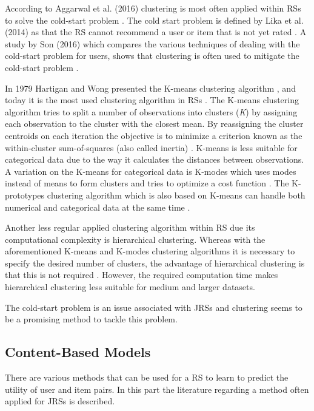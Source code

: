 According to Aggarwal et al. (2016) clustering is most often applied within RSs to solve the cold-start problem \cite{aggarwal2016recommender}.
The cold start problem is defined by Lika et al. (2014) as that the RS cannot recommend a user or item that is not yet rated \cite{lika2014facing}.
A study by Son (2016) which compares the various techniques of dealing with the cold-start problem for users, shows that clustering is often used to mitigate the cold-start problem \cite{son2016dealing}.

In 1979 Hartigan and Wong presented the K-means clustering algorithm \cite{hartigan1979algorithm}, and today it is the most used clustering algorithm in RSs \cite{aggarwal2016recommender}.
The K-means clustering algorithm tries to split a number of observations into clusters (\textit{K}) by assigning each observation to the cluster with the closest mean.
By reassigning the cluster centroids on each iteration the objective is to minimize a criterion known as the within-cluster sum-of-squares (also called inertia) \cite{mackay2003example}. 
K-means is less suitable for categorical data due to the way it calculates the distances between observations.
A variation on the K-means for categorical data is K-modes which uses modes instead of means to form clusters and tries to optimize a cost function \cite{huang1997clustering, huang1998extensions}.
The K-prototypes clustering algorithm which is also based on K-means can handle both numerical and categorical data at the same time \cite{huang1997clustering}.

Another less regular applied clustering algorithm within RS due its computational complexity is hierarchical clustering.
Whereas with the aforementioned K-means and K-modes clustering algorithms it is necessary to specify the desired number of clusters, the advantage of hierarchical clustering is that this is not required \cite{rokach2005clustering}.
However, the required computation time makes hierarchical clustering less suitable for medium and larger datasets. 

The cold-start problem is an issue associated with JRSs and clustering seems to be a promising method to tackle this problem.

\subsection{Content-Based Models}
\label{sec:cbm}
There are various methods that can be used for a RS to learn to predict the utility of user and item pairs. 
In this part the literature regarding a method often applied for JRSs is described.

